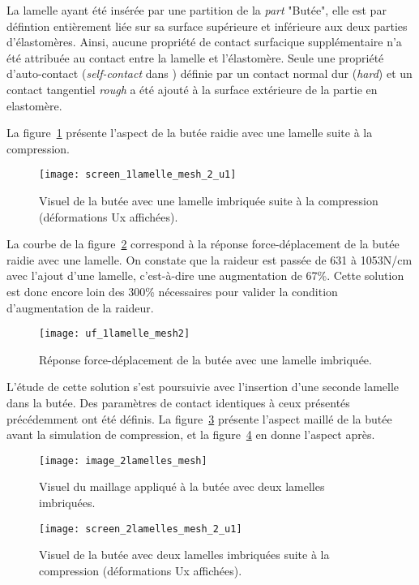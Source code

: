 ﻿\documentclass{article}
\newcommand{\abaqus}{\bsc{Abaqus}\xspace}
\newcommand{\cimg}{0.8}
\begin{document}
La lamelle ayant été insérée par une partition de la \textit{part} "Butée", elle est par défintion entièrement liée sur sa surface supérieure et inférieure aux deux parties d'élastomères. Ainsi, aucune propriété de contact surfacique supplémentaire n'a été attribuée au contact entre la lamelle et l'élastomère. Seule une propriété d'auto-contact (\textit{self-contact} dans \abaqus) définie par un contact normal dur (\textit{hard}) et un contact tangentiel \textit{rough} a été ajouté à la surface extérieure de la partie en elastomère. 

La figure~\ref{fig8} présente l'aspect de la butée raidie avec une lamelle suite à la compression.

\begin{figure}[!h]
	\centering
	\texttt{[image: screen\_1lamelle\_mesh\_2\_u1]}
	\caption{Visuel de la butée avec une lamelle imbriquée suite à la compression (déformations Ux affichées).}
	\label{fig8}
\end{figure}

La courbe de la figure~\ref{fig9} correspond à la réponse force-déplacement de la butée raidie avec une lamelle. On constate que la raideur est passée de 631 à 1053N/cm avec l'ajout d'une lamelle, c'est-à-dire une augmentation de 67\%. Cette solution est donc encore loin des 300\% nécessaires pour valider la condition d'augmentation de la raideur.

\begin{figure}[!h]
	\centering
	\texttt{[image: uf\_1lamelle\_mesh2]}
	\caption{Réponse force-déplacement de la butée avec une lamelle imbriquée.}
	\label{fig9}
\end{figure}

L'étude de cette solution s'est poursuivie avec l'insertion d'une seconde lamelle dans la butée. Des paramètres de contact identiques à ceux présentés précédemment ont été définis. La figure~\ref{fig10} présente l'aspect maillé de la butée avant la simulation de compression, et la figure~\ref{fig11} en donne l'aspect après.

\begin{figure}[!h]
	\centering
	\texttt{[image: image\_2lamelles\_mesh]}
	\caption{Visuel du maillage appliqué à la butée avec deux lamelles imbriquées.}
	\label{fig10}
\end{figure}

\begin{figure}[!h]
	\centering
	\texttt{[image: screen\_2lamelles\_mesh\_2\_u1]}
	\caption{Visuel de la butée avec deux lamelles imbriquées suite à la compression (déformations Ux affichées).}
	\label{fig11}
\end{figure}
\end{document}
